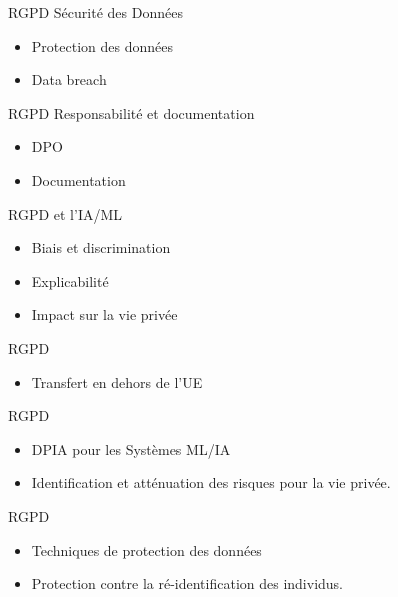 \begin{frame}{RGPD}
  Sécurité des Données
  \begin{itemize}
  \item {Protection des données}
  \item {Data breach}
  \end{itemize}
\end{frame}

\begin{frame}{RGPD}
  Responsabilité et documentation

  \begin{itemize}
  \item {DPO}
  \item {Documentation}
    \end{itemize}
\end{frame}

\begin{frame}{RGPD et l'IA/ML}
  \begin{itemize}
  \item {Biais et discrimination}
  \item {Explicabilité} 
  \item {Impact sur la vie privée}
  \end{itemize}
\end{frame}

\begin{frame}{RGPD}
    \begin{itemize}
        \item {Transfert en dehors de l'UE}
    \end{itemize}
\end{frame}

\begin{frame}{RGPD}
\begin{itemize}
    \item {DPIA pour les Systèmes ML/IA}
    \item Identification et atténuation des risques pour la vie privée.
\end{itemize}
\end{frame}

\begin{frame}{RGPD}
  \begin{itemize}
  \item {Techniques de protection des données}
  \item Protection contre la ré-identification des individus.
  \end{itemize}
\end{frame}

